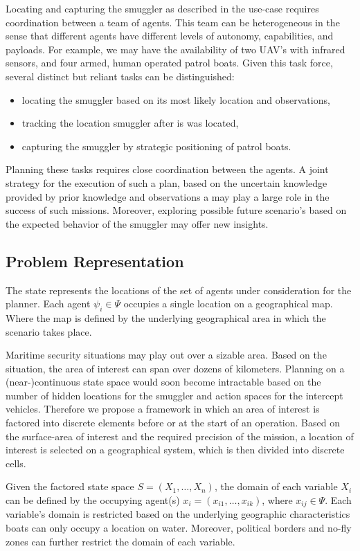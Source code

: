 \documentclass[conference]{IEEEtran}
\begin{document}
Locating and capturing the smuggler as described in the use-case requires coordination between a team of agents. This team can be heterogeneous in the sense that different agents have different levels of autonomy, capabilities, and payloads. For example, we may have the availability of two UAV's with infrared sensors, and four armed, human operated patrol boats. Given this task force, several distinct but reliant tasks can be distinguished:
\begin{itemize}
\item locating the smuggler based on its most likely location and observations,
\item tracking the location smuggler after is was located,
\item capturing the smuggler by strategic positioning of patrol boats.
\end{itemize}
Planning these tasks requires close coordination between the agents. A joint strategy for the execution of such a plan, based on the uncertain knowledge provided by prior knowledge and observations a may play a large role in the success of such missions. Moreover, exploring possible future scenario's based on the expected behavior of the smuggler may offer new insights.

\subsection{Problem Representation}
\label{sub:problem-rep}

The state represents the locations of the set of agents under consideration for the planner. Each agent $\psi_i\in\Psi$ occupies a single location on a geographical map. Where the map is defined by the underlying geographical area in which the scenario takes place.

Maritime security situations may play out over a sizable area. Based on the situation, the area of interest can span over dozens of kilometers. Planning on a (near-)continuous state space would soon become intractable based on the number of hidden locations for the smuggler and action spaces for the intercept vehicles. Therefore we propose a framework in which an area of interest is factored into discrete elements before or at the start of an operation. Based on the surface-area of interest and the required precision of the mission, a location of interest is selected on a geographical system, which is then divided into discrete cells.

Given the factored state space $S = \left(X_1,\ldots,X_n\right)$, the domain of each variable $X_i$ can be defined by the occupying agent(s) \ie $x_i=\left(x_{i1},\ldots,x_{ik}\right)$, where $x_{ij}\in\Psi$. Each variable's domain is restricted based on the underlying geographic characteristics \ie boats can only occupy a location on water. Moreover, political borders and no-fly zones can further restrict the domain of each variable.
\end{document}
